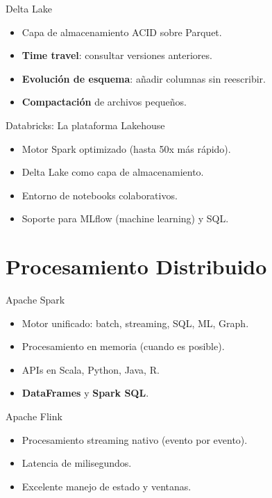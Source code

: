 \documentclass[aspectratio=169, 10pt, xcolor=table]{beamer}
\begin{document}
\begin{frame}{Delta Lake}
    \begin{itemize}
        \item Capa de almacenamiento ACID sobre Parquet.
        \item \textbf{Time travel}: consultar versiones anteriores.
        \item \textbf{Evolución de esquema}: añadir columnas sin reescribir.
        \item \textbf{Compactación} de archivos pequeños.
    \end{itemize}
\end{frame}

\begin{frame}{Databricks: La plataforma Lakehouse}
    \begin{itemize}
        \item Motor Spark optimizado (hasta 50x más rápido).
        \item Delta Lake como capa de almacenamiento.
        \item Entorno de notebooks colaborativos.
        \item Soporte para MLflow (machine learning) y SQL.
    \end{itemize}
\end{frame}

\section{Procesamiento Distribuido}

\begin{frame}{Apache Spark}
    \begin{itemize}
        \item Motor unificado: batch, streaming, SQL, ML, Graph.
        \item Procesamiento en memoria (cuando es posible).
        \item APIs en Scala, Python, Java, R.
        \item \textbf{DataFrames} y \textbf{Spark SQL}.
    \end{itemize}
\end{frame}

\begin{frame}{Apache Flink}
    \begin{itemize}
        \item Procesamiento streaming nativo (evento por evento).
        \item Latencia de milisegundos.
        \item Excelente manejo de estado y ventanas.
    \end{itemize}
\end{frame}
\end{document}
